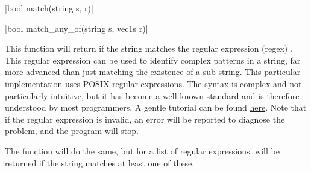 \funcitem \vectorfunc \cppinline|bool match(string s, r)| 

\vectorfunc \cppinline|bool match_any_of(string s, vec1s r)| 

This function will return \cpptrue if the string  matches the regular expression (regex) . This regular expression can be used to identify complex patterns in a string, far more advanced than just matching the existence of a sub-string. This particular implementation uses POSIX regular expressions. The syntax is complex and not particularly intuitive, but it has become a well known standard and is therefore understood by most programmers. A gentle tutorial can be found \href{http://www.zytrax.com/tech/web/regex.htm}{here}. Note that if the regular expression is invalid, an error will be reported to diagnose the problem, and the program will stop.

The function  will do the same, but for a list of regular expressions. \cpptrue will be returned if the string  matches at least one of these.

